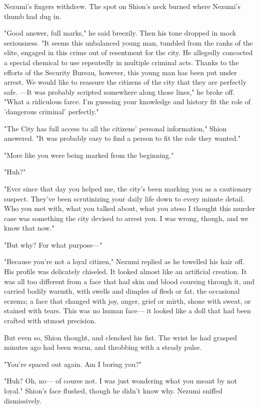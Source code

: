 Nezumi's fingers withdrew. The spot on Shion's neck burned where
Nezumi's thumb had dug in.

"Good answer, full marks," he said breezily. Then his tone dropped in
mock seriousness. "It seems this unbalanced young man, tumbled from the
ranks of the elite, engaged in this crime out of resentment for the
city. He allegedly concocted a special chemical to use repeatedly in
multiple criminal acts. Thanks to the efforts of the Security Bureau,
however, this young man has been put under arrest. We would like to
reassure the citizens of the city that they are perfectly safe. ---It was
probably scripted somewhere along those lines," he broke off. "What a
ridiculous farce. I'm guessing your knowledge and history fit the role
of 'dangerous criminal' perfectly."

"The City has full access to all the citizens' personal information,"
Shion answered. "It was probably easy to find a person to fit the role
they wanted."

"More like you were being marked from the beginning."

"Huh?"

"Ever since that day you helped me, the city's been marking you as a
cautionary suspect. They've been scrutinizing your daily life down to
every minute detail. Who you met with, what you talked about, what you
ate\el so I thought this murder case was something the city devised to
arrest you. I was wrong, though, and we know that now."

"But why? For what purpose---"

"Because you're not a loyal citizen," Nezumi replied as he towelled his
hair off. His profile was delicately chiseled. It looked almost like an
artificial creation. It was all too different from a face that had skin
and blood coursing through it, and carried bodily warmth, with swells
and dimples of flesh or fat, the occasional eczema; a face that changed
with joy, anger, grief or mirth, shone with sweat, or stained with
tears. This was no human face--- it looked like a doll that had been
crafted with utmost precision.

But even so, Shion thought, and clenched his fist. The wrist he had
grasped minutes ago had been warm, and throbbing with a steady pulse.

"You're spaced out again. Am I boring you?"

"Huh? Oh, no--- of course not. I was just wondering what you meant by\el 
not loyal." Shion's face flushed, though he didn't know why. Nezumi
sniffed dismissively.


